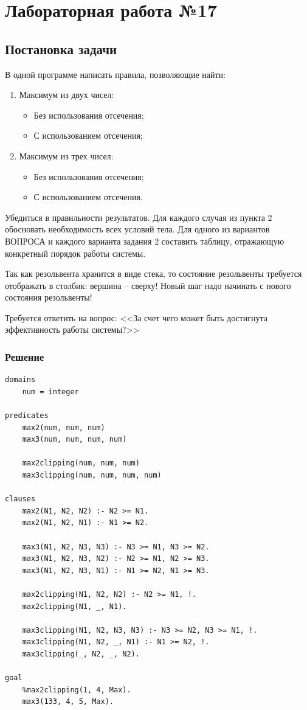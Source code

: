 \documentclass[12pt]{report}
\begin{document}
\chapter*{Лабораторная работа №17}
\section*{Постановка задачи}

В одной программе написать правила, позволяющие найти:

\begin{enumerate}
	\item Максимум из двух чисел:
	\begin{itemize}
		\item Без использования отсечения;
		\item С использованием отсечения;
	\end{itemize}
	\item Максимум из трех чисел:
	\begin{itemize}
		\item Без использования отсечения;
		\item С использованием отсечения.
	\end{itemize}
\end{enumerate}

Убедиться в правильности результатов. Для каждого случая из пункта 2 обосновать необходимость всех условий тела. Для одного из вариантов ВОПРОСА и каждого варианта задания 2 составить таблицу, отражающую конкретный порядок работы системы.

Так как резольвента хранится в виде стека, то состояние резольвенты требуется отображать в столбик: вершина – сверху! Новый шаг надо начинать с нового состояния резольвенты!

Требуется ответить на вопрос: <<За счет чего может быть достигнута эффективность работы системы?>>


\subsection*{Решение}
\begin{lstlisting}
domains
	num = integer

predicates
	max2(num, num, num)
	max3(num, num, num, num)
	
	max2clipping(num, num, num)
	max3clipping(num, num, num, num)

clauses
	max2(N1, N2, N2) :- N2 >= N1.
	max2(N1, N2, N1) :- N1 >= N2.
	
	max3(N1, N2, N3, N3) :- N3 >= N1, N3 >= N2.
	max3(N1, N2, N3, N2) :- N2 >= N1, N2 >= N3.
	max3(N1, N2, N3, N1) :- N1 >= N2, N1 >= N3.
	
	max2clipping(N1, N2, N2) :- N2 >= N1, !.
	max2clipping(N1, _, N1).
	
	max3clipping(N1, N2, N3, N3) :- N3 >= N2, N3 >= N1, !.
	max3clipping(N1, N2, _, N1) :- N1 >= N2, !.
	max3clipping(_, N2, _, N2).

goal
	%max2clipping(1, 4, Max).
	max3(133, 4, 5, Max).
\end{lstlisting}


	
\end{document}
